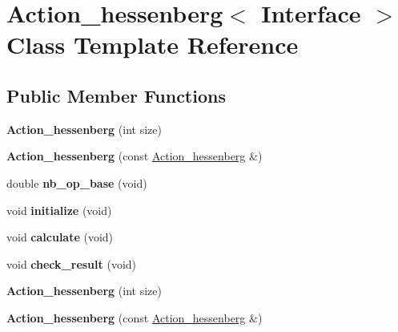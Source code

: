 \hypertarget{class_action__hessenberg}{}\section{Action\+\_\+hessenberg$<$ Interface $>$ Class Template Reference}
\label{class_action__hessenberg}
\subsection*{Public Member Functions}
\begin{DoxyCompactItemize}
\item 
\mbox{\label{class_action__hessenberg_a6b0e940d7de84f207f4cdb9eb9b0bdd2}} 
{\bfseries Action\+\_\+hessenberg} (int size)
\item 
\mbox{\label{class_action__hessenberg_afd93109875f4f2c80dfbde801e1eac3e}} 
{\bfseries Action\+\_\+hessenberg} (const \hyperlink{class_action__hessenberg}{Action\+\_\+hessenberg} \&)
\item 
\mbox{\label{class_action__hessenberg_aa30eedde77c67377fc6e8dda91a48056}} 
double {\bfseries nb\+\_\+op\+\_\+base} (void)
\item 
\mbox{\label{class_action__hessenberg_ac969cacb8011f95a41e77b9cae4f04fa}} 
void {\bfseries initialize} (void)
\item 
\mbox{\label{class_action__hessenberg_a23a90fa377d8db18f94555a1979255d3}} 
void {\bfseries calculate} (void)
\item 
\mbox{\label{class_action__hessenberg_ae9339fa00f6afc34f24374d31254ec0f}} 
void {\bfseries check\+\_\+result} (void)
\item 
\mbox{\label{class_action__hessenberg_a6b0e940d7de84f207f4cdb9eb9b0bdd2}} 
{\bfseries Action\+\_\+hessenberg} (int size)
\item 
\mbox{\label{class_action__hessenberg_afd93109875f4f2c80dfbde801e1eac3e}} 
{\bfseries Action\+\_\+hessenberg} (const \hyperlink{class_action__hessenberg}{Action\+\_\+hessenberg} \&)

\end{DoxyCompactItemize}
